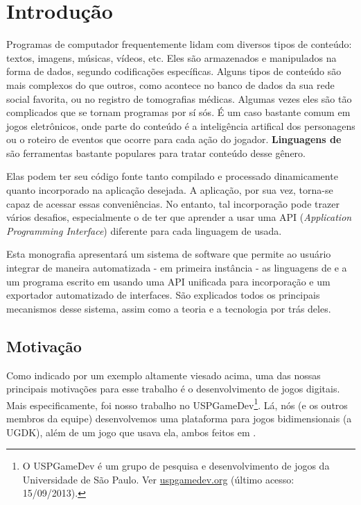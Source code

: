 
\chapter{Introdução}
\label{sec:intr}

Programas de computador frequentemente lidam com diversos tipos de conteúdo:
textos, imagens, músicas, vídeos, etc. Eles são armazenados e manipulados na
forma de dados, segundo codificações específicas. Alguns tipos de conteúdo são
mais complexos do que outros, como acontece no banco de dados da sua rede social
favorita, ou no registro de tomografias médicas. Algumas vezes eles são tão
complicados que se tornam programas por sí sós. É um caso bastante comum em
jogos eletrônicos, onde parte do conteúdo é a inteligência artifical dos
personagens ou o roteiro de eventos que ocorre para cada ação do jogador.
\textbf{Linguagens de \script{}} são ferramentas bastante populares para tratar
conteúdo desse gênero.

Elas podem ter seu código fonte tanto compilado e processado
dinamicamente quanto incorporado na aplicação desejada. A aplicação, por sua
vez, torna-se capaz de acessar essas conveniências. No entanto, tal incorporação
pode trazer vários desafios, especialmente o de ter que aprender a usar uma API
(\textit{Application Programming Interface}) diferente para cada linguagem de
\script{} usada.

Esta monografia apresentará um sistema de software que permite ao usuário
integrar de maneira automatizada - em primeira instância - as linguagens de
\script{}  e  a um programa escrito em \CXX{} usando uma
API unificada para incorporação e um exportador automatizado de interfaces. São
explicados todos os principais mecanismos desse sistema, assim como a teoria e a
tecnologia por trás deles.

\section{Motivação}
\label{sec:intr:motivacao}

Como indicado por um exemplo altamente viesado acima, uma das nossas principais
motivações para esse trabalho é o desenvolvimento de jogos digitais. Mais
especificamente, foi nosso trabalho no USPGameDev\footnote{
  O USPGameDev é um grupo de pesquisa e desenvolvimento de jogos da
  Universidade de São Paulo. Ver \url{uspgamedev.org} (último acesso: 
  15/09/2013).
}.
Lá, nós (e os outros membros da equipe) desenvolvemos uma plataforma para jogos
bidimensionais (a UGDK\footnotemark), além de um jogo que usava ela, ambos feitos em \CXX{}.

